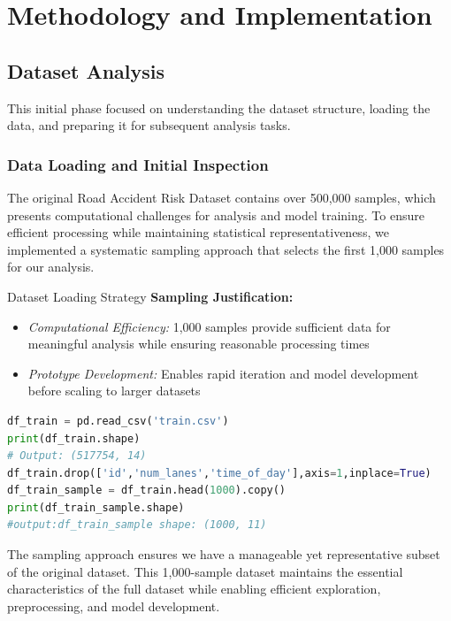 \documentclass[12pt,a4paper]{article}
\begin{document}
\section{Methodology and Implementation}

\subsection{Dataset Analysis}

This initial phase focused on understanding the dataset structure, loading the data, and preparing it for subsequent analysis tasks.

\subsubsection{Data Loading and Initial Inspection}

The original Road Accident Risk Dataset contains over 500,000 samples, which presents computational challenges for analysis and model training. To ensure efficient processing while maintaining statistical representativeness, we implemented a systematic sampling approach that selects the first 1,000 samples for our analysis.

\begin{resultbox}{Dataset Loading Strategy}
\textbf{Sampling Justification:}
\begin{itemize}
    \item \textit{Computational Efficiency:} 1,000 samples provide sufficient data for meaningful analysis while ensuring reasonable processing times
    \item \textit{Prototype Development:} Enables rapid iteration and model development before scaling to larger datasets
\end{itemize}
\end{resultbox}

\begin{lstlisting}[language=Python, caption=Dataset Loading and Initial Sampling, label=lst:dataset_loading]
df_train = pd.read_csv('train.csv')
print(df_train.shape)
# Output: (517754, 14)
df_train.drop(['id','num_lanes','time_of_day'],axis=1,inplace=True)
df_train_sample = df_train.head(1000).copy()
print(df_train_sample.shape)
#output:df_train_sample shape: (1000, 11)

\end{lstlisting}

The sampling approach ensures we have a manageable yet representative subset of the original dataset. This 1,000-sample dataset maintains the essential characteristics of the full dataset while enabling efficient exploration, preprocessing, and model development.
\end{document}
